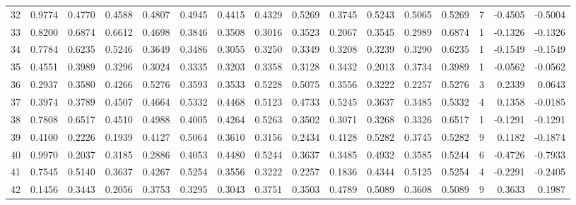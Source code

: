 \begin{tabular}{lrrrrrrrrrrrrrrr}
32  &      0.9774 &  0.4770 &  0.4588 &  0.4807 &  0.4945 &  0.4415 &  0.4329 &  0.5269 &  0.3745 &  0.5243 &   0.5065 &     0.5269 &      7 &                   -0.4505 &                    -0.5004 \\
33  &      0.8200 &  0.6874 &  0.6612 &  0.4698 &  0.3846 &  0.3508 &  0.3016 &  0.3523 &  0.2067 &  0.3545 &   0.2989 &     0.6874 &      1 &                   -0.1326 &                    -0.1326 \\
34  &      0.7784 &  0.6235 &  0.5246 &  0.3649 &  0.3486 &  0.3055 &  0.3250 &  0.3349 &  0.3208 &  0.3239 &   0.3290 &     0.6235 &      1 &                   -0.1549 &                    -0.1549 \\
35  &      0.4551 &  0.3989 &  0.3296 &  0.3024 &  0.3335 &  0.3203 &  0.3358 &  0.3128 &  0.3432 &  0.2013 &   0.3734 &     0.3989 &      1 &                   -0.0562 &                    -0.0562 \\
36  &      0.2937 &  0.3580 &  0.4266 &  0.5276 &  0.3593 &  0.3533 &  0.5228 &  0.5075 &  0.3556 &  0.3222 &   0.2257 &     0.5276 &      3 &                    0.2339 &                     0.0643 \\
37  &      0.3974 &  0.3789 &  0.4507 &  0.4664 &  0.5332 &  0.4468 &  0.5123 &  0.4733 &  0.5245 &  0.3637 &   0.3485 &     0.5332 &      4 &                    0.1358 &                    -0.0185 \\
38  &      0.7808 &  0.6517 &  0.4510 &  0.4988 &  0.4005 &  0.4264 &  0.5263 &  0.3502 &  0.3071 &  0.3268 &   0.3326 &     0.6517 &      1 &                   -0.1291 &                    -0.1291 \\
39  &      0.4100 &  0.2226 &  0.1939 &  0.4127 &  0.5064 &  0.3610 &  0.3156 &  0.2434 &  0.4128 &  0.5282 &   0.3745 &     0.5282 &      9 &                    0.1182 &                    -0.1874 \\
40  &      0.9970 &  0.2037 &  0.3185 &  0.2886 &  0.4053 &  0.4480 &  0.5244 &  0.3637 &  0.3485 &  0.4932 &   0.3585 &     0.5244 &      6 &                   -0.4726 &                    -0.7933 \\
41  &      0.7545 &  0.5140 &  0.3637 &  0.4267 &  0.5254 &  0.3556 &  0.3222 &  0.2257 &  0.1836 &  0.4344 &   0.5125 &     0.5254 &      4 &                   -0.2291 &                    -0.2405 \\
42  &      0.1456 &  0.3443 &  0.2056 &  0.3753 &  0.3295 &  0.3043 &  0.3751 &  0.3503 &  0.4789 &  0.5089 &   0.3608 &     0.5089 &      9 &                    0.3633 &                     0.1987 \\

\end{tabular}

